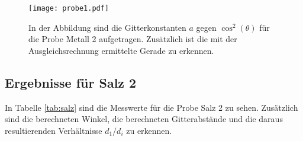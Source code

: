 \begin{figure}[H]
  \centering
  \texttt{[image: probe1.pdf]}
  \caption{In der Abbildung sind die Gitterkonstanten $a$ gegen $\cos^2(\theta)$ für die Probe Metall 2 aufgetragen. Zusätzlich ist die mit der Ausgleichsrechnung
  ermittelte Gerade zu erkennen.}
  \label{abb:metall}
\end{figure}

\subsection{Ergebnisse für Salz 2}

In Tabelle \ref{tab:salz} sind die Messwerte für die Probe Salz 2 zu sehen. Zusätzlich sind die berechneten Winkel, die berechneten Gitterabstände und die
daraus resultierenden Verhältnisse $d_1 / d_i$ zu erkennen.

